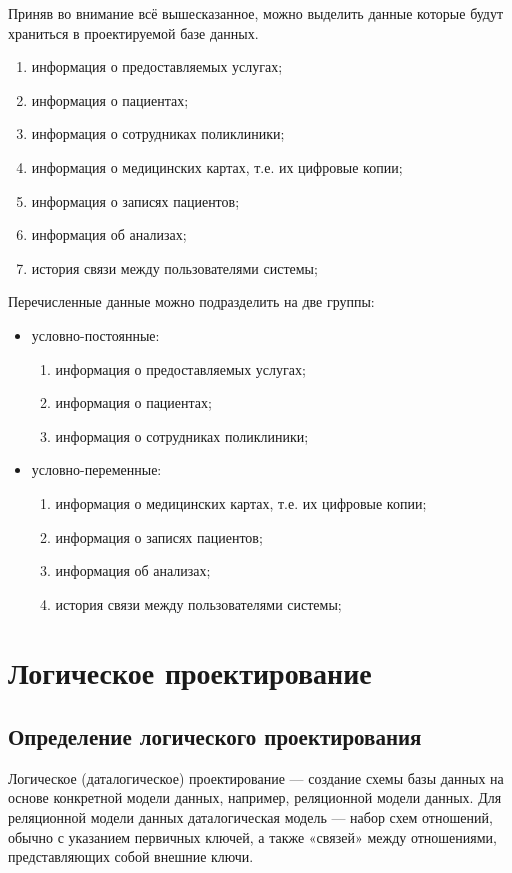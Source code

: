 \documentclass[14pt,a4paper,russian]{extreport}
\begin{document}
\newpage
Приняв во внимание всё вышесказанное, можно выделить данные которые будут храниться в проектируемой
базе данных.
\begin{enumerate}[noitemsep]
    \item информация о предоставляемых услугах;
    \item информация о пациентах;
    \item информация о сотрудниках поликлиники;
    \item информация о медицинских картах, т.е. их цифровые копии;
    \item информация о записях пациентов;
    \item информация об анализах;
    \item история связи между пользователями системы;
\end{enumerate}

\noindent Перечисленные данные можно подразделить на две группы:
\begin{itemize}[noitemsep]
    \item условно-постоянные:
        \begin{enumerate}[noitemsep]
            \item информация о предоставляемых услугах;
            \item информация о пациентах;
            \item информация о сотрудниках поликлиники;
        \end{enumerate}
    \item условно-переменные:
        \begin{enumerate}[noitemsep]
            \item информация о медицинских картах, т.е. их цифровые копии;
            \item информация о записях пациентов;
            \item информация об анализах;
            \item история связи между пользователями системы;
        \end{enumerate}
\end{itemize}


\chapter{Логическое проектирование}
\section{Определение логического проектирования}
Логическое (даталогическое) проектирование — создание схемы базы данных на основе конкретной модели
данных, например, реляционной модели данных. Для реляционной модели данных даталогическая модель —
набор схем отношений, обычно с указанием первичных ключей, а также «связей» между
отношениями, представляющих собой внешние ключи.
\end{document}
